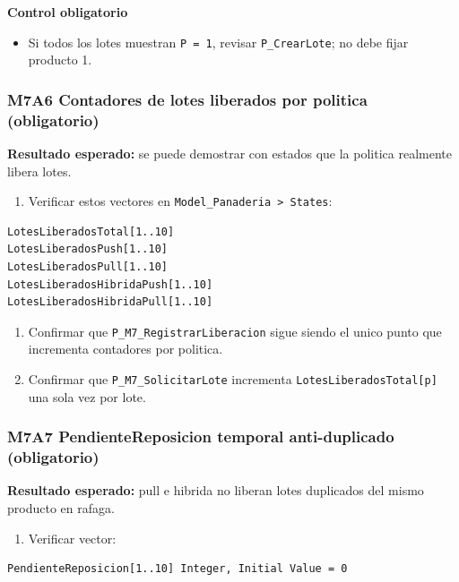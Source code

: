 \documentclass[11pt]{article}
\newcommand{\simio}[1]{\texttt{#1}}
\newcommand{\state}[1]{\texttt{#1}}
\newcommand{\proc}[1]{\texttt{#1}}
\begin{document}
\textbf{Control obligatorio}
\begin{itemize}
  \item Si todos los lotes muestran \state{P = 1}, revisar \proc{P\_CrearLote}; no debe fijar producto 1.
\end{itemize}

\subsubsection{M7A6 Contadores de lotes liberados por politica (obligatorio)}
\textbf{Resultado esperado:} se puede demostrar con estados que la politica realmente libera lotes.

\begin{enumerate}
  \item Verificar estos vectores en \simio{Model\_Panaderia > States}:
\end{enumerate}

\begin{lstlisting}[caption={Vectores obligatorios de conteo M7/M7A}]
LotesLiberadosTotal[1..10]
LotesLiberadosPush[1..10]
LotesLiberadosPull[1..10]
LotesLiberadosHibridaPush[1..10]
LotesLiberadosHibridaPull[1..10]
\end{lstlisting}

\begin{enumerate}[resume]
  \item Confirmar que \proc{P\_M7\_RegistrarLiberacion} sigue siendo el unico punto que incrementa contadores por politica.
  \item Confirmar que \proc{P\_M7\_SolicitarLote} incrementa \state{LotesLiberadosTotal[p]} una sola vez por lote.
\end{enumerate}

\subsubsection{M7A7 PendienteReposicion temporal anti-duplicado (obligatorio)}
\textbf{Resultado esperado:} pull e hibrida no liberan lotes duplicados del mismo producto en rafaga.

\begin{enumerate}
  \item Verificar vector:
\end{enumerate}

\begin{lstlisting}[caption={Vector anti-duplicado obligatorio en M7A}]
PendienteReposicion[1..10] Integer, Initial Value = 0
\end{lstlisting}
\end{document}
